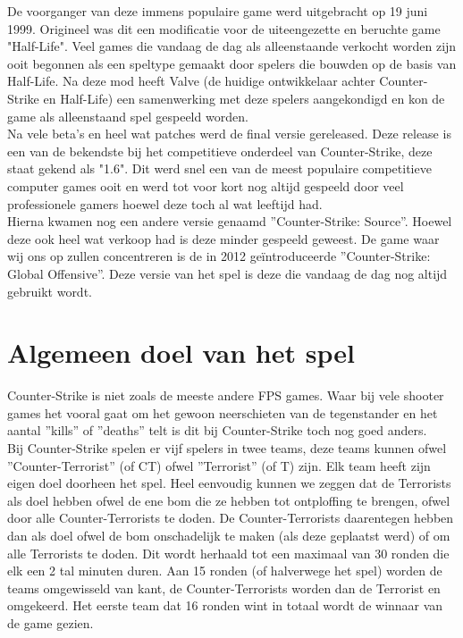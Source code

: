 \documentclass[pdftex,a4paper,12pt,twoside]{report}
\begin{document}
De voorganger van deze immens populaire game werd uitgebracht op 19 juni 1999. Origineel was dit een modificatie voor de uiteengezette en beruchte game "Half-Life". Veel games die vandaag de dag als alleenstaande verkocht worden zijn ooit begonnen als een speltype gemaakt door spelers die bouwden op de basis van Half-Life. Na deze mod heeft Valve (de huidige ontwikkelaar achter Counter-Strike en Half-Life) een samenwerking met deze spelers aangekondigd en kon de game als alleenstaand spel gespeeld worden.
\\

Na vele beta's en heel wat patches werd de final versie gereleased. Deze release is een van de bekendste bij het competitieve onderdeel van Counter-Strike, deze staat gekend als "1.6". Dit werd snel een van de meest populaire competitieve computer games ooit en werd tot voor kort nog altijd gespeeld door veel professionele gamers hoewel deze toch al wat leeftijd had.
\citep{dusttodust}
\\

Hierna kwamen nog een andere versie genaamd ''Counter-Strike: Source''. Hoewel deze ook heel wat verkoop had is deze minder gespeeld geweest. De game waar wij ons op zullen concentreren is de in 2012 geïntroduceerde ''Counter-Strike: Global Offensive''. Deze versie van het spel is deze die vandaag de dag nog altijd gebruikt wordt.

\section{Algemeen doel van het spel}
\label{sec:algemeen doel van het spel}
Counter-Strike is niet zoals de meeste andere FPS games. Waar bij vele shooter games het vooral gaat om het gewoon neerschieten van de tegenstander en het aantal ''kills'' of ''deaths'' telt is dit bij Counter-Strike toch nog goed anders.
\\

Bij Counter-Strike spelen er vijf spelers in twee teams, deze teams kunnen ofwel ''Counter-Terrorist'' (of CT) ofwel ''Terrorist'' (of T) zijn. Elk team heeft zijn eigen doel doorheen het spel. Heel eenvoudig kunnen we zeggen dat de Terrorists als doel hebben ofwel de ene bom die ze hebben tot ontploffing te brengen, ofwel door alle Counter-Terrorists te doden. 
De Counter-Terrorists daarentegen hebben dan als doel ofwel de bom onschadelijk te maken (als deze geplaatst werd) of om alle Terrorists te doden. Dit wordt herhaald tot een maximaal van 30 ronden die elk een 2 tal minuten duren. Aan 15 ronden (of halverwege het spel) worden de teams omgewisseld van kant, de Counter-Terrorists worden dan de Terrorist en omgekeerd. Het eerste team dat 16 ronden wint in totaal wordt de winnaar van de game gezien.
\\
\end{document}
